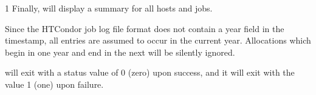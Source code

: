 \begin{ManPage}{\label{man-condor-userlog}}{1}
Finally,  will display a summary for all hosts and
jobs.

\begin{Options}
\end{Options}

\GenRem
Since the HTCondor job log file format does not contain a year field in
the timestamp, all entries are assumed to occur in the current year.
Allocations which begin in one year and end in the next will be
silently ignored.

\ExitStatus

 will exit with a status value of 0 (zero) upon success,
and it will exit with the value 1 (one) upon failure.

\end{ManPage}
